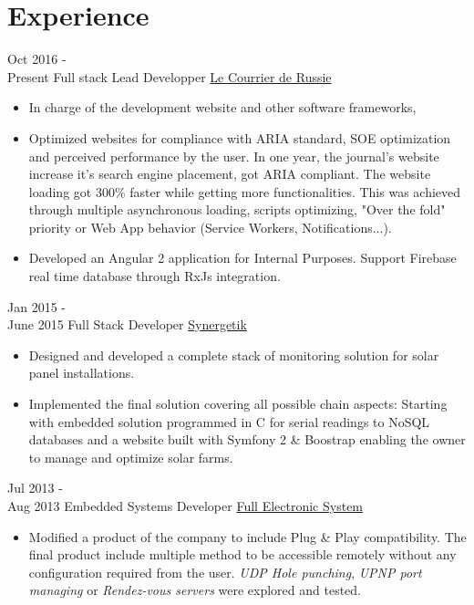 \documentclass[a4paper]{template} %
\begin{document}

\section{Experience}

\begin{twenty} %
    \twentyitem
   		{Oct 2016 - \\ Present}
        {Full stack Lead Developper}
        {\href{http://www.lecourrierderussie.com}{Le Courrier de Russie}}
        {}
        {
        {\begin{itemize}
        \item In charge of the development website and other software frameworks,
        \item Optimized websites for compliance with ARIA standard, SOE optimization and perceived performance by the user. In one year, the journal's website increase it's search engine placement, got ARIA compliant. The website loading got 300\% faster while getting more functionalities. This was achieved through multiple asynchronous loading, scripts optimizing, "Over the fold" priority or Web App behavior (Service Workers, Notifications...).
        \item Developed an Angular 2 application for Internal Purposes. Support Firebase real time database through RxJs integration.
    \end{itemize}}
        }

     \twentyitem
   		{Jan 2015 - \\ June 2015}
        {Full Stack Developer}
        {\href{http://synergetik.fr/}{Synergetik}}
        {}
        {
        \begin{itemize}
        \item Designed and developed a complete stack of monitoring solution for solar panel installations.
        \item Implemented the final solution covering all possible chain aspects: Starting with embedded solution programmed in C for serial readings to NoSQL databases and a website built with Symfony 2 \& Boostrap enabling the owner to manage and optimize solar farms.
    \end{itemize}
    	}

    	\twentyitem
   		{Jul 2013 - \\ Aug 2013}
        {Embedded Systems Developer}
        {\href{http://www.fesys.fr/fr}{Full Electronic System}}
        {}
        {
        \begin{itemize}
        \item Modified a product of the company to include Plug \& Play compatibility. The final product include multiple method to be accessible remotely without any configuration required from the user. \textit{UDP Hole punching}, \textit{UPNP port managing} or \textit{Rendez-vous servers} were explored and tested.
    \end{itemize}
    	}

\end{twenty}
\end{document}

